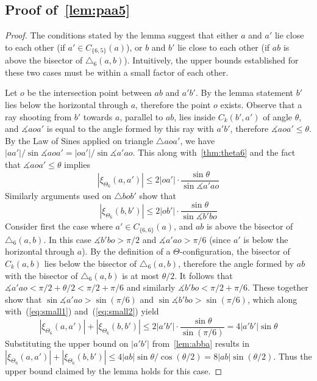 \documentclass[runningheads,a4paper]{llncs}
\newcommand{\pp}{\xi}
\newcommand{\ang}{\measuredangle}
\begin{document}
\subsection{Proof of~\autoref{lem:paa5}}

\aathirdlemma*

\begin{proof}
The conditions stated by the lemma suggest that either $a$ and $a'$ lie close to each other (if $a' \in C_{\{6,5\}}(a)$), or $b$ and $b'$ lie close to each other (if $ab$ is above the bisector of $\triangle_6(a, b)$). Intuitively, the upper bounds established for these two cases must be within a small factor of each other.  

Let $o$ be the intersection point between $ab$ and $a'b'$. By the lemma statement $b'$ lies below the horizontal through $a$, therefore the point $o$ exists.  
Observe that a ray shooting from $b'$ towards $a$, parallel to $ab$, lies inside $C_k(b',a')$ of angle $\theta$, and $\ang{aoa'}$ is equal to the angle formed by this ray with $a'b'$, therefore $\ang{aoa'} \le \theta$. By the Law of Sines applied on triangle $\triangle aoa'$, we have 
$|aa'|/\sin\ang{aoa'} = |oa'|/\sin\ang{a'ao}$. This along with~\autoref{thm:theta6} and the fact that $\ang{aoa'} \le \theta$ implies 
\begin{equation}
|\pp_{\Theta_6}(a, a')| \le 2|oa'| \cdot \frac{\sin\theta}{\sin\ang{a'ao}}
\label{eq:small1}
\end{equation}
Similarly arguments used on $\triangle bob'$ show that  
\begin{equation}
|\pp_{\Theta_6}(b, b')| \le 2|ob'| \cdot \frac{\sin\theta}{\sin\ang{b'bo}}
\label{eq:small2}
\end{equation}
Consider first the case where $a' \in C_{\{6,6\}}(a)$, and $ab$ is above the bisector of $\triangle_6(a, b)$. In this case $\ang{b'bo} > \pi/2$ and $\ang{a'ao} > \pi/6$ (since $a'$ is below the horizontal through $a$). By the definition of a $\Theta$-configuration, the bisector of $C_k(a, b)$ lies below the bisector of $\triangle_6(a, b)$, therefore the angle formed by $ab$ with the bisector of $\triangle_6(a, b)$ is at most $\theta/2$. It follows that 
$\ang{a'ao} < \pi/2+\theta/2 < \pi/2 + \pi/6$ and similarly $\ang{b'bo} < \pi/2+\pi/6$. These together show that 
$\sin\ang{a'ao} > \sin(\pi/6)$ and $\sin\ang{b'bo} > \sin(\pi/6)$, which along with~(\ref{eq:small1}) and~(\ref{eq:small2}) yield 
\begin{equation}
\label{eq:small3}
|\pp_{\Theta_6}(a, a')| +|\pp_{\Theta_6}(b, b')| \le 2|a'b'|\cdot \frac{\sin\theta}{\sin(\pi/6)} = 4|a'b'|\sin\theta
\end{equation}
Substituting  the upper bound on $|a'b'|$ from~\autoref{lem:abba} results in $|\pp_{\Theta_6}(a, a')| +|\pp_{\Theta_6}(b, b')| \le 4|ab| \sin\theta/\cos(\theta/2) = 8|ab|\sin(\theta/2)$. Thus the upper bound claimed by the lemma holds for this case. 


\end{proof}
\end{document}
